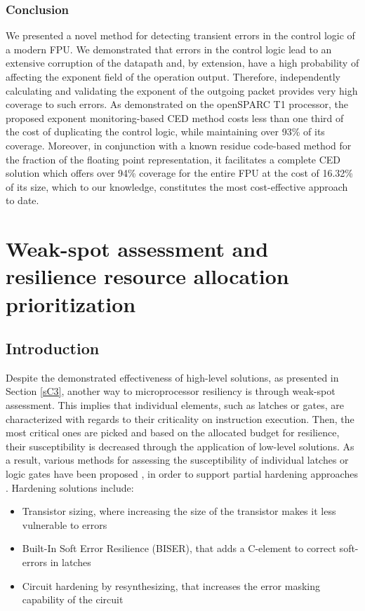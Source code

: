 \documentclass[12pt]{yalephd}
\begin{document}
\subsection{Conclusion}\label{sC3sConclusions}

We presented a novel method for detecting transient errors in the control logic of a modern FPU. We demonstrated that errors in the control logic lead to an extensive corruption of the datapath and, by extension, have a high probability of affecting the exponent field of the operation output. Therefore, independently calculating and validating the exponent of the outgoing packet provides very high coverage to such errors. As demonstrated on the openSPARC T1 processor, the proposed exponent monitoring-based CED method costs less than one third of the cost of duplicating the control logic, while maintaining over 93\% of its coverage. Moreover, in conjunction with a known residue code-based method for the fraction of the floating point representation, it facilitates a complete CED solution which offers over 94\% coverage for the entire FPU at the cost of 16.32\% of its size, which to our knowledge, constitutes the most cost-effective approach to date.


\chapter{Weak-spot assessment and resilience resource allocation prioritization}\label{sC4}

\section{Introduction}

Despite the demonstrated effectiveness of high-level solutions, as presented in Section \ref{sC3}, another way to microprocessor resiliency is through weak-spot assessment. This implies that individual elements, such as latches or gates, are characterized with regards to their criticality on instruction execution. Then, the most critical ones are picked and based on the allocated budget for resilience, their susceptibility is decreased through the application of low-level solutions. As a result, various methods for assessing the susceptibility of individual latches or logic gates have been proposed \cite{zhao2004scalable, zhang2006soft}, in order to support partial hardening approaches \cite{garg2006design, almukhaizim2006seamless, zoellin2008selective, krishnaswamy-signature}. Hardening solutions include:
\begin{itemize}
	\item Transistor sizing, where increasing the size of the transistor makes it less vulnerable to errors \cite{karnik2001scaling}
	\item Built-In Soft Error Resilience (BISER), that adds a C-element to correct soft-errors in latches \cite{mitra2008soft}
	\item Circuit hardening by resynthesizing, that increases the error masking capability of the circuit \cite{calin1996upset}
\end{itemize}
 
\end{document}
